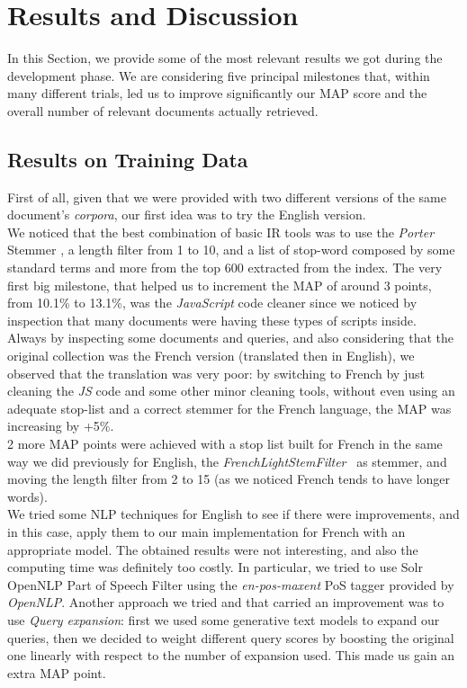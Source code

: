 \pagebreak
\section{Results and Discussion}

\label{sec:results}


In this Section, we provide some of the most relevant results we got during the development phase.
We are considering five principal milestones that, within many different trials, led us to improve significantly our \ac{MAP} score and the overall number of relevant documents actually retrieved.
\subsection{Results on Training Data}
First of all, given that we were provided with two different versions of the same document's \textit{corpora}, our first idea was to try the English version.\\
We noticed that the best combination of basic \ac{IR} tools was to use the \textit{Porter} Stemmer \cite{solrporterstemfilter}, a length filter from 1 to 10, and a list of stop-word composed by some standard terms and more from the top 600 extracted from the index.
The very first big milestone, that helped us to increment the \ac{MAP} of around 3 points, from 10.1\% to 13.1\%, was the \textit{JavaScript} code cleaner since we noticed by inspection that many documents were having these types of scripts inside.\\
Always by inspecting some documents and queries, and also considering that the original collection was the French version (translated then in English), we observed that the translation was very poor: by switching to French
by just cleaning the \textit{JS} code and some other minor cleaning tools, without even using an adequate stop-list and a correct stemmer for the French language, the \ac{MAP} was increasing by +5\%. \\
2 more \ac{MAP} points were achieved with a stop list built for French in the same way we did previously for English, the \textit{FrenchLightStemFilter}~\cite{solrfrenchlightstemfilter} as stemmer, and moving the length filter from 2 to 15 (as we noticed French tends to have longer words). \\
We tried some \ac{NLP} techniques for English to see if there were improvements, and in this case, apply them to our main implementation for French with an appropriate model. The obtained results were not interesting, and also the computing time was definitely too costly. In particular, we tried to use Solr OpenNLP Part of Speech Filter \cite{solropennlpposfilter} using the \textit{en-pos-maxent} \ac{PoS} tagger provided by \textit{OpenNLP}.
Another approach we tried and that carried an improvement was to use \textit{Query expansion}: first we used some generative text models to expand our queries, then we decided to weight different query scores by boosting the original one linearly with respect to the number
of expansion used. This made us gain an extra \ac{MAP} point.


